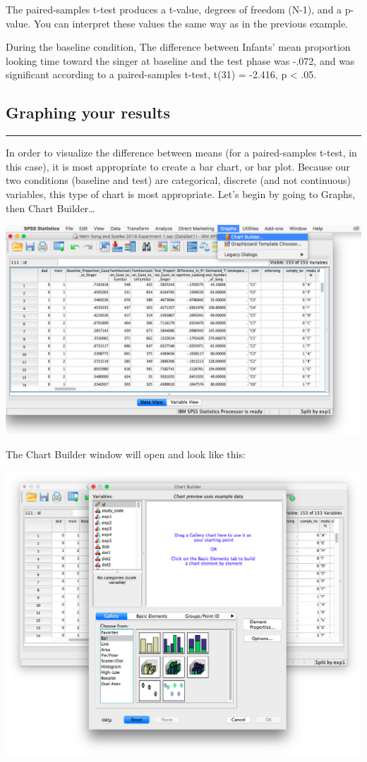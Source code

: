 \documentclass[
]{book}
\begin{document}
The paired-samples t-test produces a t-value, degrees of freedom (N-1), and a p-value. You can interpret these values the same way as in the previous example.

During the baseline condition, The difference between Infants' mean proportion looking time toward the singer at baseline and the test phase was -.072, and was significant according to a paired-samples t-test, t(31) = -2.416, p \textless{} .05.

\hypertarget{graphing-your-results}{%
\subsection{Graphing your results}\label{graphing-your-results}}

\begin{center}\rule{0.5\linewidth}{0.5pt}\end{center}

In order to visualize the difference between means (for a paired-samples t-test, in this case), it is most appropriate to create a bar chart, or bar plot. Because our two conditions (baseline and test) are categorical, discrete (and not continuous) variables, this type of chart is most appropriate. Let's begin by going to {Graphs}, then {Chart Builder\ldots{}}

\includegraphics{img/6.4.20.png}

The Chart Builder window will open and look like this:

\includegraphics{img/6.4.21.png}
\end{document}
